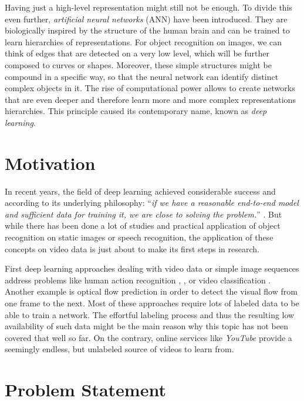 Having just a high-level representation might still not be enough. To divide this even further, \textit{artificial neural networks} (ANN) have been introduced. They are biologically inspired by the structure of the human brain \parencite{ann} and can be trained to learn hierarchies of representations. For object recognition on images, we can think of edges that are detected on a very low level, which will be further composed to curves or shapes. Moreover, these simple structures might be compound in a specific way, so that the neural network can identify distinct complex objects in it. The rise of computational power allows to create networks that are even deeper and therefore learn more and more complex representations hierarchies. This principle caused its contemporary name, known as \textit{deep learning}.

\section{Motivation}

In recent years, the field of deep learning achieved considerable success and according to its underlying philosophy: ``\textit{if we have a reasonable end-to-end model and sufficient data for training it, we are close to solving the problem.}'' \parencite{conv_lstm_nowcasting}. But while there has been done a lot of studies and practical application of object recognition on static images or speech recognition, the application of these concepts on video data is just about to make its first steps in research. 

First deep learning approaches dealing with video data or simple image sequences address problems like human action recognition \parencite{conv3d_action_class}, \parencite{two_stream_action}, \parencite{longterm_rec_recog} or video classification \parencite{large_video_class}. Another example is optical flow prediction \parencite{flownet} in order to detect the visual flow from one frame to the next. Most of these approaches require lots of labeled data to be able to train a network. The effortful labeling process and thus the resulting low availability of such data might be the main reason why this topic has not been covered that well so far. On the contrary, online services like \textit{YouTube} provide a seemingly endless, but unlabeled source of videos to learn from.


\section{Problem Statement}

